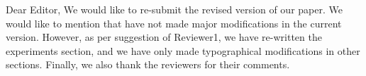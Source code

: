 Dear Editor,
We would like to re-submit the revised version of our paper. We would like to mention that have not made major modifications in the current version. 
However, as per suggestion of Reviewer1, we have re-written the experiments section, and we have only made typographical modifications in other sections. Finally, we also thank the reviewers for their comments. 

